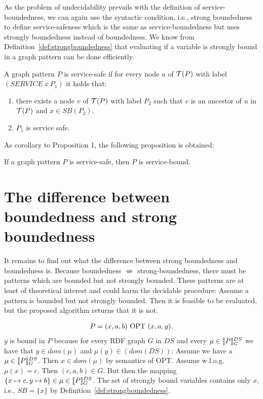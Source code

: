 As the problem of undecidability prevails with the definition of
service-boundedness, we can again use the syntactic condition, i.e., strong boundedness to define
service-safeness which is the same as service-boundedness but uses strongly
boundedness instead of boundedness. We know from
Definition~\ref{def:strongboundedness} that evaluating if a variable is strongly
bound in a graph pattern can be done efficiently.

\begin{definition}
	A graph pattern $P$ is service-safe if for every node $u$ of $\mathcal{T}(P)$ with
	label $(SERVICE \ x \ P_1)$ it holds that:
	\begin{enumerate}
		\item there exists a node $v$ of $\mathcal{T}(P)$ with label $P_2$ such that $v$
			is an ancestor of $u$ in $\mathcal{T}(P)$ and $x \in SB(P_2)$.
		\item $P_1$ is service safe.
	\end{enumerate}
\end{definition}

As corollary to Proposition 1, the following proposition is obtained:
\begin{proposition}
	If a graph pattern $P$ is service-safe, then $P$ is service-bound.
\end{proposition}

\section{The difference between boundedness and strong boundedness}
It remains to find out what the difference between strong boundedness
and boundedness is. Because boundedness $\not \Leftrightarrow$ strong-boundedness, there
must be patterns which are bounded but not strongly bounded. These patterns are at least
of theoretical interest and could harm the decidable procedure:
Assume a pattern is bounded but not strongly bounded. Then it is feasible to be evaluated, 
but the proposed algorithm returns that it is not.

\begin{example}\label{bbutnotsbound}
	\begin{align*}
		P = (x,a, b) \mbox{ OPT } (x, a, y).
	\end{align*}
	$y$ is bound in $P$ because for every RDF graph $G$ in $DS$ and
	every $\mu \in \llbracket P \rrbracket^{DS}_G$ we have that $y \in dom(\mu)$ and
	$\mu(y) \in (dom(DS))$: Assume we have a $\mu \in \llbracket P \rrbracket^{DS}_G$. Then $x
	\in dom(\mu)$ by semantics of OPT. Assume w.l.o.g. $\mu(x) = c$. Then
	$(c,a, b) \in G$. But then the mapping $\{ x \mapsto c , y\mapsto b \} \in
	\mu \in \llbracket P \rrbracket^{DS}_G$.
	The set of strongly bound variables contains
	only $x$, i.e., $SB = \{ x \}$ by Definition~\ref{def:strongboundedness}.
\end{example}


